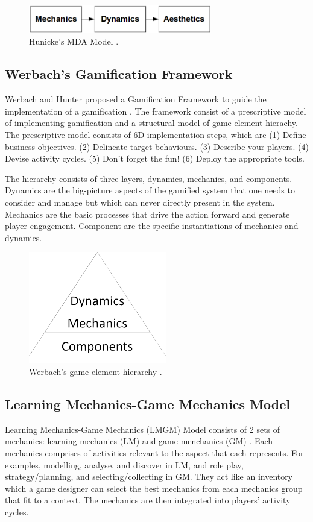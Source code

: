 \documentclass[12pt, a4paper]{report}
\begin{document}
\begin{figure}[ht]
\centering
\includegraphics[width=8cm]{mda}
\caption{Hunicke's MDA Model \cite{hunicke2004mda}.}
\label{fig:mda}
\end{figure}

\subsection{Werbach's Gamification Framework}
Werbach and Hunter proposed a Gamification Framework to guide the implementation of a gamification \cite{werbach2012win}. The framework consist of  a prescriptive model of implementing gamification and a structural model of game element hierachy. The prescriptive model consists of 6D implementation steps, which are (1) Define  business objectives. (2) Delineate target behaviours. (3) Describe your players. (4) Devise activity cycles. (5) Don't forget the fun! (6) Deploy the appropriate tools.

The hierarchy consists of three layers, dynamics, mechanics, and components. Dynamics are the big-picture aspects of the gamified system that one needs to consider and manage but which can never directly present in the system. Mechanics are the basic processes that drive the action forward and generate player engagement. Component are the specific instantiations of mechanics and dynamics. 

\begin{figure}[ht]
\centering
\includegraphics[width=6cm]{werbach}
\caption{Werbach's game element hierarchy \cite{werbach2012win}.}
\label{fig:werbach}
\end{figure}

\subsection{Learning Mechanics-Game Mechanics Model}
Learning Mechanics-Game Mechanics (LMGM) Model consists of 2 sets of mechanics: learning mechanics (LM)  and game menchanics (GM) \cite{arnab2015mapping}. Each mechanics comprises of activities relevant to the aspect that each represents. For examples, modelling, analyse, and discover in LM, and role play, strategy/planning, and selecting/collecting in GM. They act like an inventory which a game designer can select the best mechanics from each mechanics group that fit to a context. The mechanics are then integrated into players' activity cycles.
\end{document}
